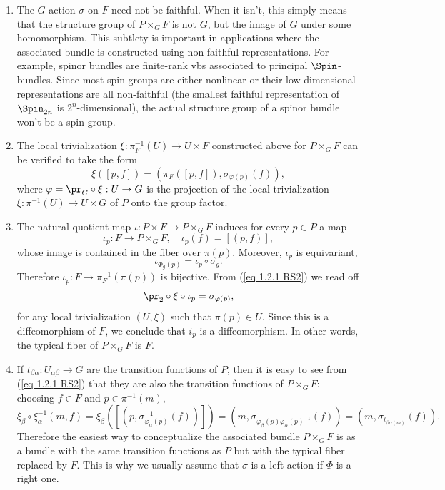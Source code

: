\begin{rem}\label{rem 1.2.3 RS2}
    \begin{enumerate}
        \item The $G$-action $\sigma$ on $F$ need not be faithful. When it isn't, this simply means that the structure group of $P\times_G F$ is not $G$, but the image of $G$ under some homomorphism. This subtlety is important in applications where the associated bundle is constructed using non-faithful representations. For example, spinor bundles are finite-rank \glspl{vb} associated to principal $\Spin$-bundles. Since most spin groups are either nonlinear or their low-dimensional representations are all non-faithful (the smallest faithful representation of $\Spin_{2n}$ is $2^n$-dimensional), the actual structure group of a spinor bundle won't be a spin group.
        \item The local trivialization $\xi:\pi_F^{-1}(U)\to U\times F$ constructed above for $P\times_G F$ can be verified to take the form
        \[\xi([p,f])=(\pi_F([p,f]),\sigma_{\varphi(p)}(f)),\label{eq 1.2.1 RS2}\]
        where $\varphi=\pr_G\circ \xi:U\to G$ is the projection of the local trivialization $\xi:\pi^{-1}(U)\to U\times G$ of $P$ onto the group factor.
        \item The natural quotient map $\iota:P\times F\to P\times_G F$ induces for every $p\in P$ a map 
        \[\iota_p:F\to P\times_G F,\quad  \iota_p(f)=[(p,f)],\label{eq 1.2.2 RS2 def iotap}\]
        whose image is contained in the fiber over $\pi(p)$.  Moreover, $\iota_p$ is equivariant,
        \[\iota_{\Phi_g(p)}=\iota_p\circ \sigma_g.\label{eq 1.2.3 RS2}\]
        Therefore $\iota_p:F\to \pi_F^{-1}(\pi(p))$ is bijective.  From (\ref{eq 1.2.1 RS2}) we read off
        \[\pr_2\circ\xi\circ \iota_p=\sigma_{\varphi(p)},\]
        for any local trivialization $(U,\xi)$ such that $\pi(p)\in U$. Since this is a diffeomorphism of $F$, we conclude that $i_p$ is a diffeomorphism. In other words, the typical fiber of $P\times_G F$ is $F$.
        \item If $t_{\beta\alpha}:U_{\alpha\beta}\to G$ are the transition functions of $P$, then it is easy to see from (\ref{eq 1.2.1 RS2}) that they are also the transition functions of $P\times_G F$: choosing $f\in F$ and $p\in \pi^{-1}(m)$,
        \[\xi_\beta\circ\xi_{\alpha}^{-1}(m,f)=\xi_\beta([(p,\sigma_{\varphi_\alpha(p)}^{-1}(f))])=(m,\sigma_{\varphi_\beta(p)\varphi_\alpha(p)^{-1}}(f))=(m,\sigma_{t_{\beta\alpha(m)}}(f)).\]
        Therefore the easiest way to conceptualize the associated bundle $P\times_G F$ is as a bundle with the same transition functions as $P$ but with the typical fiber replaced by $F$. This is why we usually assume that $\sigma$ is a left action if $\Phi$ is a right one.
    \end{enumerate}
\end{rem}

